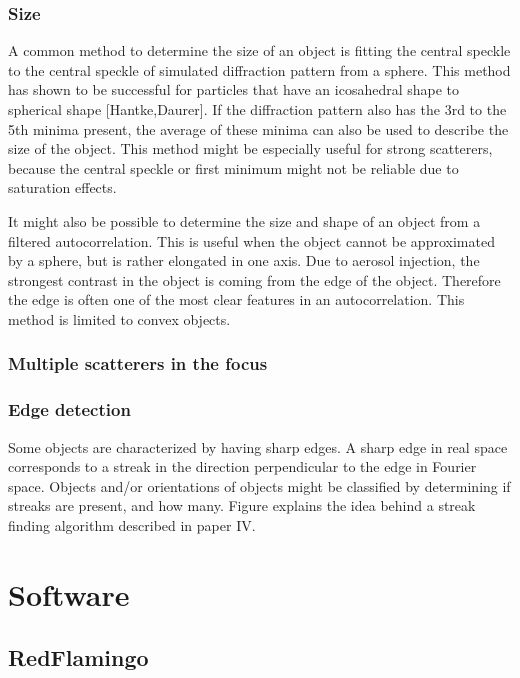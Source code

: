 \subsection{Size}
A common method to determine the size of an object is fitting the central speckle to the central speckle of simulated diffraction pattern from a sphere. This method has shown to be successful for particles that have an icosahedral shape to spherical shape [Hantke,Daurer]. If the diffraction pattern also has the 3rd to the 5th minima present, the average of these minima can also be used to describe the size of the object. This method might be especially useful for strong scatterers, because the central speckle or first minimum might not be reliable due to saturation effects.

It might also be possible to determine the size and shape of an object from a filtered autocorrelation. This is useful when the object cannot be approximated by a sphere, but is rather elongated in one axis. Due to aerosol injection, the strongest contrast in the object is coming from the edge of the object. Therefore the edge is often one of the most clear features in an autocorrelation. This method is limited to convex objects.

\subsection{Multiple scatterers in the focus}


\subsection{Edge detection}
Some objects are characterized by having sharp edges. A sharp edge in real space corresponds to a streak in the direction perpendicular to the edge in Fourier space. Objects and/or orientations of objects might be classified by determining if streaks are present, and how many. Figure explains the idea behind a streak finding algorithm described in paper IV.


\chapter{Software}
\section{RedFlamingo}
